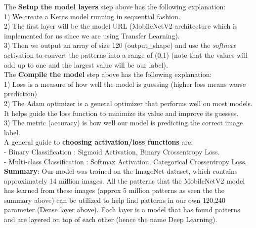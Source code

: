 \documentclass[11pt, a4paper]{article}
\begin{document}
\begin{spacing}{1.1}
	\noindent The \textbf{Setup the model layers} step above has the following explanation: \\
	\hspace*{2mm} 1) We create a Keras model running in sequential fashion. \\
	\hspace*{2mm} 2) The first layer will be the model URL (MobileNetV2 architecture which is implemented for us since \hspace*{7mm} we are using Transfer Learning). \\
	\hspace*{2mm} 3) Then we output an array of size 120 (output\_shape) and use the \textit{softmax} activation to convert \hspace*{8mm} the patterns into a range of (0,1) (note that the values will add up to one and the largest value will \hspace*{8mm} be our label). \vspace*{1.5mm} \\
	The \textbf{Compile the model} step above has the following explanation: \\
	\hspace*{2mm} 1) Loss is a measure of how well the model is guessing (higher loss means worse prediction) \\
	\hspace*{2mm} 2) The Adam optimizer is a general optimizer that performs well on most models. It helps guide the \hspace*{7mm} loss function to minimize its value and improve its guesses. \\
	\hspace*{2mm} 3) The metric (accuracy) is how well our model is predicting the correct image label. \vspace*{1.5mm} \\
	A general guide to \textbf{choosing activation/loss functions} are: \\
	\hspace*{2mm} - Binary Classification : Sigmoid Activation, Binary Crossentropy Loss. \\
	\hspace*{2mm} - Multi-class Classification : Softmax Activation, Categorical Crossentropy Loss. \vspace*{1.5mm} \\
	\textbf{Summary}: Our model was trained on the ImageNet dataset, which contains approximately 14 million images. All the patterns that the MobileNetV2 model has learned from these images (approx 5 million patterns as seen the the summary above) can be utilized to help find patterns in our own 120,240 parameter (Dense layer above). Each layer is a model that has found patterns and are layered on top of each other (hence the name Deep Learning). \vspace*{2mm}	

\end{spacing}
\end{document}
